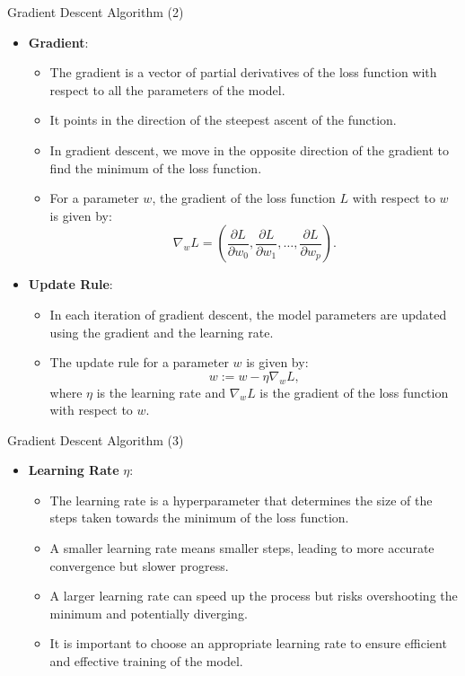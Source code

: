 \documentclass[10pt, hyperref={colorlinks = true,linkcolor = blue}]{beamer}
\begin{document}
{{ \begin{frame}{Gradient Descent Algorithm (2)}
\begin{itemize}
  \item \textbf{Gradient}:
    \begin{itemize}
        \item The gradient is a vector of partial derivatives of the loss function with respect to all the parameters of the model.
        \item It points in the direction of the steepest ascent of the function.
        \item In gradient descent, we move in the opposite direction of the gradient to find the minimum of the loss function.
        \item For a parameter \(w\), the gradient of the loss function \(L\) with respect to \(w\) is given by:
        \[
        \nabla_w L = \left( \frac{\partial L}{\partial w_0}, \frac{\partial L}{\partial w_1}, \ldots, \frac{\partial L}{\partial w_p} \right).
        \]
    \end{itemize}
     \item \textbf{Update Rule}:
    \begin{itemize}
        \item In each iteration of gradient descent, the model parameters are updated using the gradient and the learning rate.
        \item The update rule for a parameter \(w\) is given by:
        \[
        w := w - \eta \nabla_w L,
        \]
        where \(\eta\) is the learning rate and \(\nabla_w L\) is the gradient of the loss function with respect to \(w\).
    \end{itemize}
    \end{itemize}
\end{frame}


\begin{frame}{Gradient Descent Algorithm (3)}
\begin{itemize}
    \item \textbf{Learning Rate} $\eta$:
    \begin{itemize}
        \item The learning rate is a hyperparameter that determines the size of the steps taken towards the minimum of the loss function.
        \item A smaller learning rate means smaller steps, leading to more accurate convergence but slower progress.
        \item A larger learning rate can speed up the process but risks overshooting the minimum and potentially diverging.
        \item It is important to choose an appropriate learning rate to ensure efficient and effective training of the model.
    \end{itemize}
   

\end{itemize}
\end{frame}}}
\end{document}
